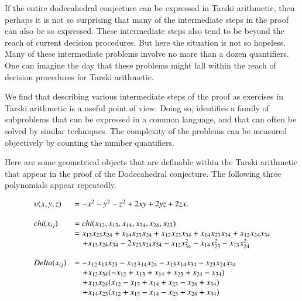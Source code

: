 If the entire dodecahedral conjecture can be expressed
in Tarski arithmetic, then perhaps it is not so surprising that
many of the intermediate steps in the proof can also be so expressed.
These intermediate steps also tend to be beyond the reach of
current decision procedures.  
But here the situation is not so hopeless.  Many of these
intermediate problems involve no more than a dozen quantifiers.
One can imagine the day that these problems might fall within the
reach of decision procedures for Tarski arithmetic.

We find that describing various intermediate steps 
of the proof as exercises
in Tarski arithmetic is a useful point of view.  Doing so, identifies
a family of subproblems that can be expressed in a common language,
and that can often be solved by similar techniques.  
The complexity of the
problems can be measured objectively by counting the number
quantifiers.

Here are some geometrical 
objects that are definable within the Tarski arithmetic
that appear in the proof of the Dodecahedral conjecture.
The following three polynomials appear repeatedly.
\begin{definition}
$$
\begin{array}{lll}
\ups(x,y,z) &= -x^2 - y^2 - z^2 + 2 x y + 2 y z + 2 z x.\\
\\
 \chi(x_{ij}) &= \chi(x_{12},x_{13},x_{14},x_{34},x_{24},x_{23})\\
     &=
      x_{13} x_{23} x_{24} + x_{14} x_{23} x_{24}  + 
      x_{12} x_{23} x_{34} + x_{14} x_{23} x_{34} + x_{12} x_{24} x_{34}\\ 
      &\quad + x_{13} x_{24} x_{34} - 
      2 x_{23} x_{24} x_{34} - x_{12} x_{34}^2 
      - x_{14} x_{23}^2 - x_{13} x_{24}^2\\
\\
\Delta(x_{ij}) &= 
   -x_{12} x_{13} x_{23} - x_{12} x_{14} x_{24} - x_{13} x_{14} x_{34} 
    - x_{23} x_{24} x_{34}\\
    &\quad + x_{12} x_{34} (-x_{12} + x_{13} + x_{14} + x_{23} + x_{24} - x_{34}) \\
  &\quad + x_{13} x_{24} (x_{12} - x_{13} + x_{14} + x_{23} - x_{24} + x_{34})\\
    &\quad + x_{14} x_{23} (x_{12} + x_{13} - x_{14} - x_{23} + x_{24} + x_{34})\\
\end{array}
    \label{def:chi}
\label{def:tar:delta}
\label{def:ups}
$$
\end{definition}

